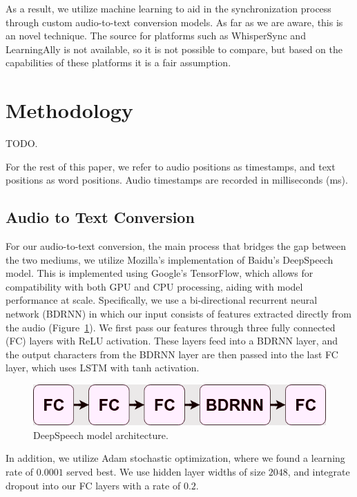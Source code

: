 \documentclass[10pt,twocolumn,letterpaper]{article}
\begin{document}
As a result, we utilize machine learning to aid in the synchronization process through custom audio-to-text conversion models. As far as we are aware, this is an novel technique. The source for platforms such as WhisperSync and LearningAlly is not available, so it is not possible to compare, but based on the capabilities of these platforms it is a fair assumption.

\section{Methodology}
TODO.

For the rest of this paper, we refer to audio positions as timestamps, and text positions as word positions. Audio timestamps are recorded in milliseconds (ms).
\subsection{Audio to Text Conversion}
For our audio-to-text conversion, the main process that bridges the gap between the two mediums, we utilize Mozilla's implementation\cite{} of Baidu's DeepSpeech\cite{} model. This is implemented using Google's TensorFlow\cite{}, which allows for compatibility with both GPU and CPU processing, aiding with model performance at scale. Specifically, we use a bi-directional recurrent neural network (BDRNN) in which our input consists of features extracted directly from the audio (Figure~\ref{fig:model-arch}). We first pass our features through three fully connected (FC) layers with ReLU activation. These layers feed into a BDRNN layer, and the output characters from the BDRNN layer are then passed into the last FC layer, which uses LSTM with tanh activation\cite{https://hacks.mozilla.org/2017/11/a-journey-to-10-word-error-rate/}.

\begin{figure}[ht]
\centering
\includegraphics[width=\columnwidth]{img/deepspeech-model}\newline
\caption{DeepSpeech model architecture.}
\label{fig:model-arch}
\end{figure}

In addition, we utilize Adam\cite{} stochastic optimization, where we found a learning rate of $0.0001$ served best. We use hidden layer widths of size $2048$, and integrate dropout into our FC layers with a rate of $0.2$.
\end{document}
